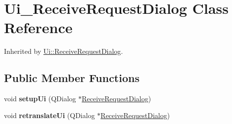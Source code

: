 \hypertarget{class_ui___receive_request_dialog}{}\section{Ui\+\_\+\+Receive\+Request\+Dialog Class Reference}
\label{class_ui___receive_request_dialog}


Inherited by \mbox{\hyperlink{class_ui_1_1_receive_request_dialog}{Ui\+::\+Receive\+Request\+Dialog}}.

\subsection*{Public Member Functions}
\begin{DoxyCompactItemize}
\item 
\mbox{\label{class_ui___receive_request_dialog_a3255fb386bb693daee03f77845b11efa}} 
void {\bfseries setup\+Ui} (Q\+Dialog $\ast$\mbox{\hyperlink{class_receive_request_dialog}{Receive\+Request\+Dialog}})
\item 
\mbox{\label{class_ui___receive_request_dialog_a97297b788a3555a03a1b555c55064aea}} 
void {\bfseries retranslate\+Ui} (Q\+Dialog $\ast$\mbox{\hyperlink{class_receive_request_dialog}{Receive\+Request\+Dialog}})
\end{DoxyCompactItemize}
